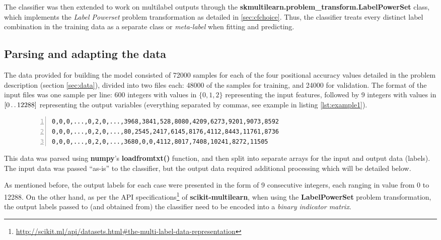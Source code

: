 \documentclass{kthreport}
\theoremstyle{definition}
\newcommand{\twodots}{\mathinner {\ldotp \ldotp}}
\begin{document}
The classifier was then extended to work on multilabel outputs through the \textbf{skmultilearn.problem\_transform.LabelPowerSet} class, which implements the \emph{Label Powerset} problem transformation as detailed in \ref{sec:cfchoice}. 
Thus, the classifier treats every distinct label combination in the training data as a separate class or \emph{meta-label} when fitting and predicting.

\subsection{Parsing and adapting the data}\label{sec:parsing}

The data provided for building the model consisted of \num{72000} samples for each of the four positional accuracy values detailed in the problem description (section \ref{sec:data}), divided into two files each: \num{48000} of the samples for training, and \num{24 000} for validation. The format of the input files was one sample per line: \num{600} integers with values in $\{0, 1, 2\}$ representing the input features, followed by \num{9} integers with values in $[0 \twodots 12288]$ representing the output variables (everything separated by commas, see example in listing \ref{lst:example1}).

\begin{figure}[tb]
\begin{lstlisting}[captionpos=b,
basicstyle={\small\ttfamily},
numbers=left, 
numberstyle=\tiny\color{gray},
caption={Abbreviated example of input samples.},
label={lst:example1}]
0,0,0,...,0,2,0,...,3968,3841,528,8080,4209,6273,9201,9073,8592
0,0,0,...,0,2,0,...,80,2545,2417,6145,8176,4112,8443,11761,8736
0,0,0,...,0,2,0,...,3680,0,0,4112,8017,7408,10241,8272,11505
\end{lstlisting}
\end{figure}


This data was parsed using \textbf{numpy}'s \textbf{loadfromtxt()} function, and then split into separate arrays for the input and output data (labels). The input data was passed ``as-is'' to the classifier, but the output data required additional processing which will be detailed below.


As mentioned before, the output labels for each case were presented in the form of \num{9} consecutive integers, each ranging in value from \num{0} to \num{12288}. On the other hand, as per the API specifications\footnote{\url{http://scikit.ml/api/datasets.html#the-multi-label-data-representation}} of \textbf{scikit-multilearn}, when using the \textbf{LabelPowerSet} problem transformation, the output labels passed to (and obtained from) the classifier need to be encoded into a \emph{binary indicator matrix}. 
\end{document}

